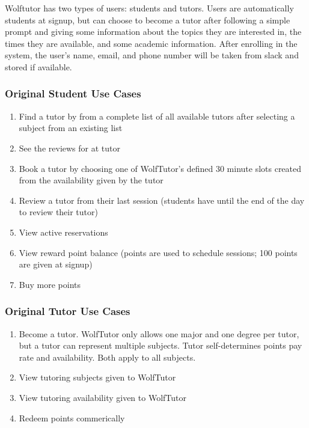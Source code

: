 Wolftutor has two types of users: students and tutors. Users are automatically
students at signup, but can choose to become a tutor after following a simple
prompt and giving some information about the topics they are interested in, the
times they are available, and some academic information. After enrolling in the
system, the user's name, email, and phone number will be taken from slack and
stored if available.

\subsubsection{Original Student Use Cases}
\label{sec:student-use-cases}

\begin{enumerate}
\item Find a tutor by from a complete list of all available tutors after
  selecting a subject from an existing list
\item See the reviews for at tutor
\item Book a tutor by choosing one of WolfTutor's defined 30 minute slots
  created from the availability given by the tutor
\item Review a tutor from their last session (students have until the end of the
  day to review their tutor)
\item View active reservations
\item View reward point balance (points are used to schedule sessions; 100
  points are given at signup)
  \item Buy more points
\end{enumerate}

\subsubsection{Original Tutor Use Cases}
\label{sec:tutor-use-cases}

\begin{enumerate}
  \item Become a tutor. WolfTutor only allows one major and one degree per tutor, but a tutor can represent multiple subjects. Tutor self-determines points pay rate and availability. Both apply to all subjects.
  \item View tutoring subjects given to WolfTutor
  \item View tutoring availability given to WolfTutor
  \item Redeem points commerically
\end{enumerate}
